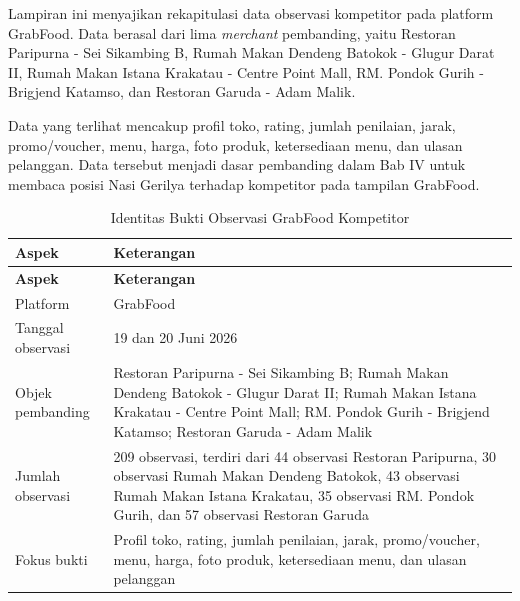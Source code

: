 \label{app:evidence-observasi-grabfood-kompetitor-20260619}

Lampiran ini menyajikan rekapitulasi data observasi kompetitor pada platform GrabFood. Data berasal dari lima \textit{merchant} pembanding, yaitu Restoran Paripurna - Sei Sikambing B, Rumah Makan Dendeng Batokok - Glugur Darat II, Rumah Makan Istana Krakatau - Centre Point Mall, RM. Pondok Gurih - Brigjend Katamso, dan Restoran Garuda - Adam Malik.

Data yang terlihat mencakup profil toko, rating, jumlah penilaian, jarak, promo/voucher, menu, harga, foto produk, ketersediaan menu, dan ulasan pelanggan. Data tersebut menjadi dasar pembanding dalam Bab IV untuk membaca posisi Nasi Gerilya terhadap kompetitor pada tampilan GrabFood.

\begingroup
\begin{xltabular}{\textwidth}{|Z{3.6cm}|Y|}
\caption{Identitas Bukti Observasi GrabFood Kompetitor}
\label{tab:identitas-evidence-observasi-grabfood-kompetitor-20260619} \\
        \toprule
        \textbf{Aspek} & \textbf{Keterangan} \\ \hline
        \midrule
\endfirsthead
{}
        \toprule
        \textbf{Aspek} & \textbf{Keterangan} \\ \hline
        \midrule
\endhead
{}
\endfoot
        \bottomrule
        \endlastfoot
        Platform & GrabFood \\ \hline
        Tanggal observasi & 19 dan 20 Juni 2026 \\ \hline
        Objek pembanding & Restoran Paripurna - Sei Sikambing B; Rumah Makan Dendeng Batokok - Glugur Darat II; Rumah Makan Istana Krakatau - Centre Point Mall; RM. Pondok Gurih - Brigjend Katamso; Restoran Garuda - Adam Malik \\ \hline
        Jumlah observasi & 209 observasi, terdiri dari 44 observasi Restoran Paripurna, 30 observasi Rumah Makan Dendeng Batokok, 43 observasi Rumah Makan Istana Krakatau, 35 observasi RM. Pondok Gurih, dan 57 observasi Restoran Garuda \\ \hline
        Fokus bukti & Profil toko, rating, jumlah penilaian, jarak, promo/voucher, menu, harga, foto produk, ketersediaan menu, dan ulasan pelanggan \\ \hline
        \bottomrule
    
\end{xltabular}
\endgroup

